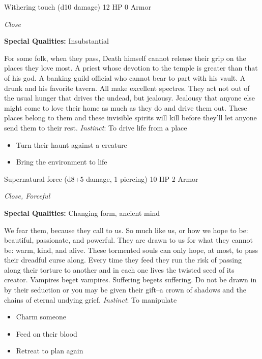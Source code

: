 Withering touch (d10 damage)\hspace*{\fill} 12 HP 0 Armor

\emph{Close}

\textbf{Special Qualities:}
Insubstantial

\HRule
For some folk, when they pass, Death himself cannot release their grip on the places they love most. A priest whose devotion to the temple is greater than that of his god. A banking guild official who cannot bear to part with his vault. A drunk and his favorite tavern. All make excellent spectres. They act not out of the usual hunger that drives the undead, but jealousy. Jealousy that anyone else might come to love their home as much as they do and drive them out. These places belong to them and these invisible spirits will kill before they'll let anyone send them to their rest. \emph{Instinct}: To drive life from a place
\begin{itemize}
\item Turn their haunt against a creature
\item Bring the environment to life
\end{itemize}

\HRule
{}

Supernatural force (d8+5 damage, 1 piercing)\hspace*{\fill} 10 HP 2 Armor

\emph{Close, Forceful}

\textbf{Special Qualities:}
Changing form, ancient mind

\HRule
We fear them, because they call to us. So much like us, or how we hope to be: beautiful, passionate, and powerful. They are drawn to us for what they cannot be: warm, kind, and alive. These tormented souls can only hope, at most, to pass their dreadful curse along. Every time they feed they run the risk of passing along their torture to another and in each one lives the twisted seed of its creator. Vampires beget vampires. Suffering begets suffering. Do not be drawn in by their seduction or you may be given their gift--a crown of shadows and the chains of eternal undying grief. \emph{Instinct}: To manipulate
\begin{itemize}
\item Charm someone
\item Feed on their blood
\item Retreat to plan again
\end{itemize}

